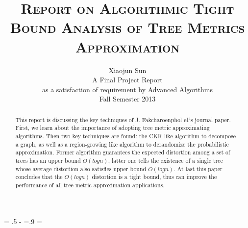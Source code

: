 \documentclass[11pt,twocolumn]{IEEEtran}
\newcommand{\ls}[1]
    {\dimen0=\fontdimen6\the\font
     \lineskip=#1\dimen0
     \advance\lineskip.5\fontdimen5\the\font
     \advance\lineskip-\dimen0
     \lineskiplimit=.9\lineskip
     \baselineskip=\lineskip
     \advance\baselineskip\dimen0
     \normallineskip\lineskip
     \normallineskiplimit\lineskiplimit
     \normalbaselineskip\baselineskip
     \ignorespaces
    }
\begin{document}

\ls{1.1}

\title{\large{\textsc{Report  on Algorithmic Tight Bound Analysis of
      Tree Metrics Approximation}}}
\author{Xiaojun Sun\\
A Final Project Report\\
as a satisfaction of requirement by Advanced Algorithms\\
Fall Semester 2013
}

%
 
\maketitle

\newcommand{\Fq}{{\mathbb{F}}_{q}}
\newcommand{\Fkk}{{\mathbb{F}}_{2^k}}
\newcommand{\Fkkx}[1][x]{\ensuremath{\mathbb{F}}_{2^k}[#1]\xspace}
\newcommand{\Grobner}{Gr\"{o}bner\xspace}
\newcommand{\B}{{\mathbb{B}}}
\newcommand{\Z}{{\mathbb{Z}}}
\newcommand{\F}{{\mathcal{F}}}
\newcommand{\G}{{\mathcal{G}}}
\newcommand{\R}{\mathbb{R}}

\newcommand{\debug}[1]{\textcolor{gray}{[ #1 ]}}



\begin{abstract}
This report is discussing the key techniques of J. Fakcharoenphol el.'s journal paper\cite{thispaper}.
First, we learn about the importance of adopting tree metric approximating algorithms. Then two key
techniques are found: the CKR like algorithm to decompose a graph, as well as a region-growing like
algorithm to derandomize the probabilistic approximation. Former algorithm guarantees the expected
distortion among a set of trees has an upper bound $O(logn)$, latter one tells the existence of a single
tree whose average distortion also satisfies upper bound $O(logn)$. At last this paper concludes that
the $O(logn)$ distortion is a tight bound, thus can improve the performance of all tree metric approximation
applications. 
\end{abstract}
\end{document}
